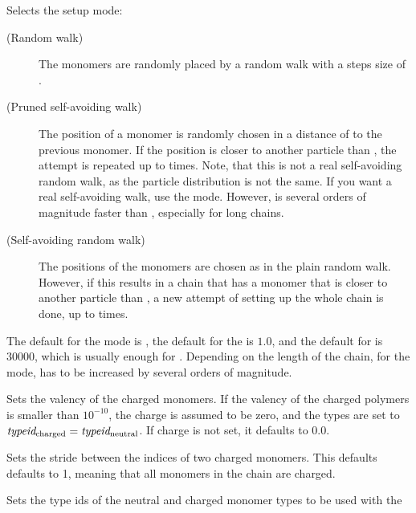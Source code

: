 \begin{arguments}
\item[\opt{mode \alt{RW  \asep  PSAW  \asep  SAW} \opt{\var{shield}
      \opt{\var{try_\mathrm{max}}}}}]
  Selects the setup mode:
  \begin{description}
  \item[ (Random walk)] The monomers are
    randomly placed by a random walk with a steps size of
    .
  \item[ (Pruned self-avoiding walk)] The position of a
    monomer is randomly chosen in a distance of  to
    the previous monomer. If the position is closer to another
    particle than , the attempt is repeated up to
     times. Note, that this is not a real self-avoiding
    random walk, as the particle distribution is not the same. If you
    want a real self-avoiding walk, use the  mode.
    However,  is several orders of magnitude faster than
    , especially for long chains.
  \item[ (Self-avoiding random walk)] The positions of
    the monomers are chosen as in the plain random walk. However, if
    this results in a chain that has a monomer that is closer to
    another particle than , a new attempt of setting up
    the whole chain is done, up to  times.
  \end{description}
  The default for the mode is , the default for the
   is $1.0$, and the default for  is
  $30000$, which is usually enough for . Depending on
  the length of the chain, for the  mode,
   has to be increased by several orders of
  magnitude.
\item[\opt{charge \var{valency}}] Sets the valency of the charged
  monomers.  If the valency of the charged polymers  is
  smaller than $10^{-10}$, the charge is assumed to be zero, and the
  types are set to $\mathrm{\mathit{typeid_\mathrm{charged}}} =
  \mathrm{\mathit{typeid_\mathrm{neutral}}}$. If charge is not set, it defaults to
  0.0.
\item[\opt{distance \var{d_\mathrm{charged}}}] Sets the stride
  between the indices of two charged monomers. This defaults defaults
  to 1, meaning that all monomers in the chain are charged.
\item[\opt{types \var{typeid_\mathrm{neutral}}
    \var{typeid_\mathrm{charged}}}] Sets the type ids of the neutral
    and charged monomer types to be used with the 

\end{arguments}
